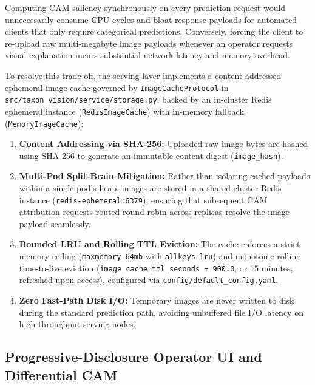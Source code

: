 Computing CAM saliency synchronously on every prediction request would unnecessarily consume CPU cycles and bloat response payloads for automated clients that only require categorical predictions. Conversely, forcing the client to re-upload raw multi-megabyte image payloads whenever an operator requests visual explanation incurs substantial network latency and memory overhead.

To resolve this trade-off, the serving layer implements a content-addressed ephemeral image cache governed by \nolinkurl{ImageCacheProtocol} in \nolinkurl{src/taxon_vision/service/storage.py}, backed by an in-cluster Redis ephemeral instance (\texttt{Redis\-Image\-Cache}) with in-memory fallback (\texttt{Memory\-Image\-Cache}):
\begin{enumerate}
    \item \textbf{Content Addressing via SHA-256:} Uploaded raw image bytes are hashed using SHA-256 to generate an immutable content digest (\texttt{image\_hash}).
    \item \textbf{Multi-Pod Split-Brain Mitigation:} Rather than isolating cached payloads within a single pod's heap, images are stored in a shared cluster Redis instance (\texttt{redis-ephemeral:6379}), ensuring that subsequent CAM attribution requests routed round-robin across replicas resolve the image payload seamlessly.
    \item \textbf{Bounded LRU and Rolling TTL Eviction:} The cache enforces a strict memory ceiling (\texttt{maxmemory 64mb} with \texttt{allkeys-lru}) and monotonic rolling time-to-live eviction (\texttt{image\_cache\_ttl\_seconds = 900.0}, or 15 minutes, refreshed upon access), configured via \nolinkurl{config/default_config.yaml}.
    \item \textbf{Zero Fast-Path Disk I/O:} Temporary images are never written to disk during the standard prediction path, avoiding unbuffered file I/O latency on high-throughput serving nodes.
\end{enumerate}

\subsection{Progressive-Disclosure Operator UI and Differential CAM}
\label{subsec:cam_progressive_disclosure}

